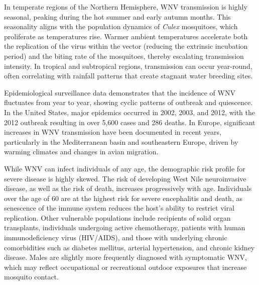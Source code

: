 In temperate regions of the Northern Hemisphere, WNV transmission is highly seasonal, peaking during the hot summer and early autumn months. This seasonality aligns with the population dynamics of \textit{Culex} mosquitoes, which proliferate as temperatures rise. Warmer ambient temperatures accelerate both the replication of the virus within the vector (reducing the extrinsic incubation period) and the biting rate of the mosquitoes, thereby escalating transmission intensity. In tropical and subtropical regions, transmission can occur year-round, often correlating with rainfall patterns that create stagnant water breeding sites.

Epidemiological surveillance data demonstrates that the incidence of WNV fluctuates from year to year, showing cyclic patterns of outbreak and quiescence. In the United States, major epidemics occurred in 2002, 2003, and 2012, with the 2012 outbreak resulting in over 5,600 cases and 286 deaths. In Europe, significant increases in WNV transmission have been documented in recent years, particularly in the Mediterranean basin and southeastern Europe, driven by warming climates and changes in avian migration.

While WNV can infect individuals of any age, the demographic risk profile for severe disease is highly skewed. The risk of developing West Nile neuroinvasive disease, as well as the risk of death, increases progressively with age. Individuals over the age of 60 are at the highest risk for severe encephalitis and death, as senescence of the immune system reduces the host's ability to restrict viral replication. Other vulnerable populations include recipients of solid organ transplants, individuals undergoing active chemotherapy, patients with human immunodeficiency virus (HIV/AIDS), and those with underlying chronic comorbidities such as diabetes mellitus, arterial hypertension, and chronic kidney disease. Males are slightly more frequently diagnosed with symptomatic WNV, which may reflect occupational or recreational outdoor exposures that increase mosquito contact.

